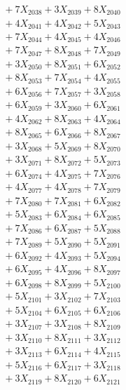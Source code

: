 \documentclass[a4paper,10pt]{article}
\begin{document}
{\begin{align}
&\;  + 7 X_{2038} + 3 X_{2039} + 8 X_{2040} \\[0.3ex]
&\;  + 4 X_{2041} + 4 X_{2042} + 5 X_{2043} \\[0.3ex]
&\;  + 7 X_{2044} + 4 X_{2045} + 4 X_{2046} \\[0.3ex]
&\;  + 7 X_{2047} + 8 X_{2048} + 7 X_{2049} \\[0.5ex]\allowbreak
&\;  + 3 X_{2050} + 8 X_{2051} + 6 X_{2052} \\[0.3ex]
&\;  + 8 X_{2053} + 7 X_{2054} + 4 X_{2055} \\[0.3ex]
&\;  + 6 X_{2056} + 7 X_{2057} + 3 X_{2058} \\[0.3ex]
&\;  + 6 X_{2059} + 3 X_{2060} + 6 X_{2061} \\[0.3ex]
&\;  + 4 X_{2062} + 8 X_{2063} + 4 X_{2064} \\[0.3ex]
&\;  + 8 X_{2065} + 6 X_{2066} + 8 X_{2067} \\[0.3ex]
&\;  + 3 X_{2068} + 5 X_{2069} + 8 X_{2070} \\[0.3ex]
&\;  + 3 X_{2071} + 8 X_{2072} + 5 X_{2073} \\[0.3ex]
&\;  + 6 X_{2074} + 4 X_{2075} + 7 X_{2076} \\[0.3ex]
&\;  + 4 X_{2077} + 4 X_{2078} + 7 X_{2079} \\[0.5ex]\allowbreak
&\;  + 7 X_{2080} + 7 X_{2081} + 6 X_{2082} \\[0.3ex]
&\;  + 5 X_{2083} + 6 X_{2084} + 6 X_{2085} \\[0.3ex]
&\;  + 7 X_{2086} + 6 X_{2087} + 5 X_{2088} \\[0.3ex]
&\;  + 7 X_{2089} + 5 X_{2090} + 5 X_{2091} \\[0.3ex]
&\;  + 6 X_{2092} + 4 X_{2093} + 5 X_{2094} \\[0.3ex]
&\;  + 6 X_{2095} + 4 X_{2096} + 8 X_{2097} \\[0.3ex]
&\;  + 6 X_{2098} + 8 X_{2099} + 5 X_{2100} \\[0.3ex]
&\;  + 5 X_{2101} + 3 X_{2102} + 7 X_{2103} \\[0.3ex]
&\;  + 5 X_{2104} + 6 X_{2105} + 6 X_{2106} \\[0.3ex]
&\;  + 3 X_{2107} + 3 X_{2108} + 8 X_{2109} \\[0.5ex]\allowbreak
&\;  + 3 X_{2110} + 8 X_{2111} + 3 X_{2112} \\[0.3ex]
&\;  + 3 X_{2113} + 6 X_{2114} + 4 X_{2115} \\[0.3ex]
&\;  + 5 X_{2116} + 6 X_{2117} + 3 X_{2118} \\[0.3ex]
&\;  + 3 X_{2119} + 8 X_{2120} + 6 X_{2121} \\[0.3ex]

\end{align}}
\end{document}
